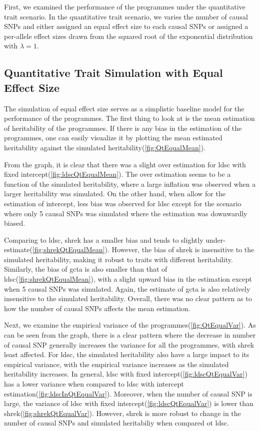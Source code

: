 		First, we examined the performance of the programmes under the quantitative trait scenario. 
		In the quantitative trait scenario, we varies the number of causal \glspl{SNP} and either assigned an equal effect size to each causal \glspl{SNP} or assigned a per-allele effect sizes drawn from the squared root of the exponential distribution with $\lambda=1$.
		
		\subsection{Quantitative Trait Simulation with Equal Effect Size}
		
		The simulation of equal effect size serves as a simplistic baseline model for the performance of the programmes.
		The first thing to look at is the mean estimation of heritability of the programmes.
		If there is any bias in the estimation of the programmes, one can easily visualize it by plotting the mean estimated heritability against the simulated heritability(\cref{fig:QtEqualMean}).
		
		From the graph, it is clear that there was a slight over estimation for \gls{ldsc} with fixed intercept(\cref{fig:ldscQtEqualMean}).
		The over estimation seems to be a function of the simulated heritability, where a large inflation was observed when a larger heritability was simulated.
		On the other hand, when allow for the estimation of intercept, less bias was observed for \gls{ldsc} except for the scenario where only 5 causal \glspl{SNP} was simulated where the estimation was downwardly biased.
		
		Comparing to \gls{ldsc}, \gls{shrek} has a smaller bias and tends to slightly under-estimate(\cref{fig:shrekQtEqualMean}).
		However, the bias of \gls{shrek} is insensitive to the simulated heritability, making it robust to traits with different heritability.
		Similarly, the bias of \gls{gcta} is also smaller than that of \gls{ldsc}(\cref{fig:shrekQtEqualMean}), with a slight upward bias in the estimation except when 5 causal \glspl{SNP} was simulated.
		Again, the estimate of \gls{gcta} is also relatively insensitive to the simulated heritability.
		Overall, there was no clear pattern as to how the number of causal \glspl{SNP} affects the mean estimation. 
		
		Next, we examine the empirical variance of the programmes(\cref{fig:QtEqualVar}).
		As can be seen from the graph, there is a clear pattern where the decrease in number of causal \gls{SNP} generally increases the variance for all the programmes, with \gls{shrek} least affected.
		For \gls{ldsc}, the simulated heritability also have a large impact to its empirical variance, with the empirical variance increases as the simulated heritability increases.
		In general, \gls{ldsc} with fixed intercept(\cref{fig:ldscQtEqualVar}) has a lower variance when compared to \gls{ldsc} with intercept estimation(\cref{fig:ldscInQtEqualVar}). 
		Moreover, when the number of causal \gls{SNP} is large, the variance of \gls{ldsc} with fixed intercept(\cref{fig:ldscQtEqualVar}) is lower than \gls{shrek}(\cref{fig:shrekQtEqualVar}).
		However, \gls{shrek} is more robust to change in the number of causal \glspl{SNP} and simulated heritabiliy when compared ot \gls{ldsc}.

